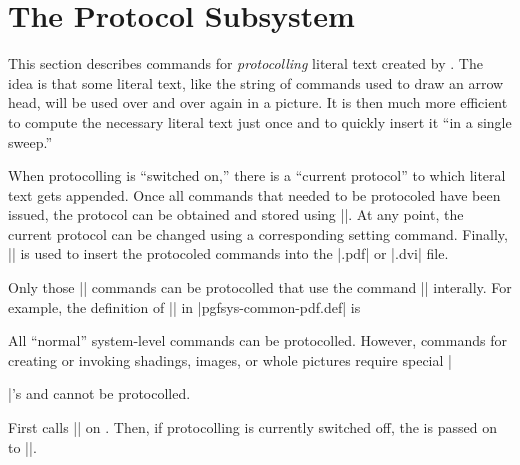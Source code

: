 %
%
%

\section{The Protocol Subsystem}

\label{section-protocols}

\makeatletter

This section describes commands for \emph{protocolling} literal text
created by \pgfname. The idea is that some literal text, like the string
of commands used to draw an arrow head, will be used over and over
again in a picture. It is then much more efficient to compute the
necessary literal text just once and to quickly insert it ``in a
single sweep.''

When protocolling is ``switched on,'' there is a ``current protocol''
to which literal text gets appended. Once all commands that needed to
be protocoled have been issued, the protocol can be obtained and
stored using |\pgfsysprotocol@getcurrentprotocol|. At any point, the
current protocol can be changed using a corresponding setting
command. Finally, |\pgfsysprotocol@invokecurrentprotocol| is used to
insert the protocoled commands into the |.pdf| or |.dvi| file.

Only those |\pgfsys@| commands can be protocolled that use the
command |\pgfsysprotocol@literal| interally. For example, the
definition of |\pgfsys@moveto| in |pgfsys-common-pdf.def| is
\begin{codeexample}
\def\pgfsys@moveto#1#2{\pgfsysprotocol@literal{#1 #2 m}}
\end{codeexample}
All ``normal'' system-level commands can be protocolled. However,
commands for creating or invoking shadings, images, or whole pictures
require special |\special|'s and cannot be protocolled.


\begin{command}{\pgfsysprotocol@literal{}}
  First calls |\pgfsysprotocol@literalbuffered| on . Then, if protocolling is currently switched off, the
   is passed on to |\pgfsys@invoke|.
\end{command}

